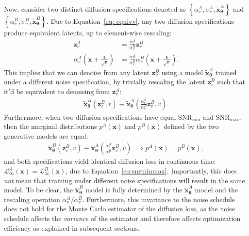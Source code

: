 Now, consider two distinct diffusion specifications denoted as $\left\{\alpha^A_v, \sigma^A_v, \tilde{\mathbf{x}}^A_{\boldsymbol{\theta}}\right\}$ and $\left\{\alpha^B_v, \sigma^B_v, \tilde{\mathbf{x}}^B_{\boldsymbol{\theta}}\right\}$. Due to Equation~\ref{eq: equivv}, any two diffusion specifications produce equivalent latents, up to element-wise rescaling:
%
\begin{align}
    \mathbf{z}^A_v &= \frac{\alpha_v^A}{\alpha_v^B} \mathbf{z}^B_v
    \\[5pt] \alpha^A_v \left( \mathbf{x} + \frac{\boldsymbol{\epsilon}}{\sqrt{v}}\right) &= \frac{\alpha_v^A}{\alpha_v^B} \alpha^B_v \left( \mathbf{x} + \frac{\boldsymbol{\epsilon}}{\sqrt{v}}\right).
\end{align}
%
This implies that we can denoise from any latent $\mathbf{z}^B_v$ using a model $\tilde{\mathbf{x}}_{\boldsymbol{\theta}}^A$ trained under a different noise specification, by trivially rescaling the latent $\mathbf{z}^B_v$ such that it'd be equivalent to denoising from $\mathbf{z}^A_v$:
%
\begin{align}
    \tilde{\mathbf{x}}_{\boldsymbol{\theta}}^B\left(\mathbf{z}^B_v, v \right) \equiv \tilde{\mathbf{x}}_{\boldsymbol{\theta}}^A\left(\frac{\alpha_v^A}{\alpha_v^B} \mathbf{z}^B_v, v \right).
\end{align}
%
Furthermore, when two diffusion specifications have equal $\mathrm{SNR}_{\mathrm{min}}$ and $\mathrm{SNR}_{\mathrm{max}}$, then the marginal distributions $p^A(\mathbf{x})$ and $p^B(\mathbf{x})$ defined by the two generative models are equal:
%
\begin{align}
    \tilde{\mathbf{x}}_{\boldsymbol{\theta}}^B\left(\mathbf{z}^B_v, v \right) \equiv \tilde{\mathbf{x}}_{\boldsymbol{\theta}}^A\left(\frac{\alpha_v^A}{\alpha_v^B} \mathbf{z}^B_v, v \right) \implies p^A(\mathbf{x}) = p^B(\mathbf{x}),
\end{align}
%
and both specifications yield identical diffusion loss in continuous time: $\mathcal{L}^A_\infty(\mathbf{x}) = \mathcal{L}^B_\infty(\mathbf{x})$, due to Equation~\ref{eq:snrminmax}. Importantly, this does \textit{not} mean that training under different noise specifications will result in the same model. To be clear, the $\tilde{\mathbf{x}}_{\boldsymbol{\theta}}^B$ model is fully determined by the $\tilde{\mathbf{x}}_{\boldsymbol{\theta}}^A$ model and the rescaling operation $\alpha_v^A/\alpha_v^B$. Furthermore, this invariance to the noise schedule does not hold for the Monte Carlo estimator of the diffusion loss, as the noise schedule affects the \textit{variance} of the estimator and therefore affects optimization efficiency as explained in subsequent sections.